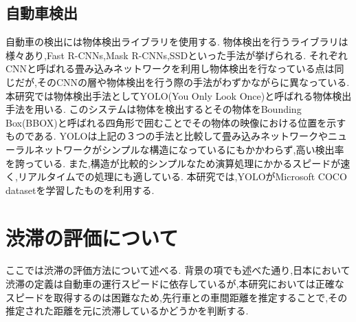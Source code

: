 \subsection{自動車検出}
自動車の検出には物体検出ライブラリを使用する.
物体検出を行うライブラリは様々あり,Fast R-CNNs,Mask R-CNNs,SSDといった手法が挙げられる.
それぞれCNNと呼ばれる畳み込みネットワークを利用し物体検出を行なっている点は同じだが,そのCNNの層や物体検出を行う際の手法がわずかながらに異なっている.
本研究では物体検出手法としてYOLO(You Only Look Once)と呼ばれる物体検出手法を用いる.
このシステムは物体を検出するとその物体をBounding Box(BBOX)と呼ばれる四角形で囲むことでその物体の映像における位置を示すものである.
YOLOは上記の３つの手法と比較して畳み込みネットワークやニューラルネットワークがシンプルな構造になっているにもかかわらず,高い検出率を誇っている.
また,構造が比較的シンプルなため演算処理にかかるスピードが速く,リアルタイムでの処理にも適している.
本研究では,YOLOがMicrosoft COCO datasetを学習したものを利用する.



\section{渋滞の評価について}
ここでは渋滞の評価方法について述べる.
背景の項でも述べた通り,日本において渋滞の定義は自動車の運行スピードに依存しているが,本研究においては正確なスピードを取得するのは困難なため,先行車との車間距離を推定することで,その推定された距離を元に渋滞しているかどうかを判断する.